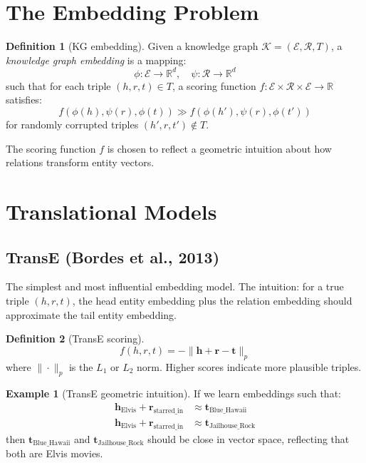 \documentclass[11pt,a4paper,oneside,openany]{book}
\theoremstyle{definition}
\newtheorem{definition}{Definition}[chapter]
\newtheorem{example}{Example}[chapter]
\theoremstyle{plain}
\theoremstyle{remark}
\newcommand{\R}{\mathbb{R}}
\newcommand{\cE}{\mathcal{E}}
\newcommand{\cR}{\mathcal{R}}
\newcommand{\kg}{\mathcal{K}}
\begin{document}
\section{The Embedding Problem}\label{sec:emb-problem}

\begin{definition}[KG embedding]
	Given a knowledge graph $\kg = (\cE, \cR, T)$, a \emph{knowledge graph embedding} is a mapping:
	$$\phi: \cE \to \R^d, \quad \psi: \cR \to \R^d$$
	such that for each triple $(h, r, t) \in T$, a scoring function $f: \cE \times \cR \times \cE \to \R$ satisfies:
	$$f(\phi(h), \psi(r), \phi(t)) \gg f(\phi(h'), \psi(r), \phi(t'))$$
	for randomly corrupted triples $(h', r, t') \notin T$.
\end{definition}

The scoring function $f$ is chosen to reflect a geometric intuition about how relations transform entity vectors.

\section{Translational Models}\label{sec:translational}

\subsection{TransE (Bordes et al., 2013)}

The simplest and most influential embedding model. The intuition: for a true triple $(h, r, t)$, the head entity embedding plus the relation embedding should approximate the tail entity embedding.

\begin{definition}[TransE scoring]
	$$f(h, r, t) = -\|\mathbf{h} + \mathbf{r} - \mathbf{t}\|_p$$
	where $\|\cdot\|_p$ is the $L_1$ or $L_2$ norm. Higher scores indicate more plausible triples.
\end{definition}

\begin{example}[TransE geometric intuition]
	If we learn embeddings such that:
	\begin{align*}
		\mathbf{h}_{\text{Elvis}} + \mathbf{r}_{\text{starred\_in}} & \approx \mathbf{t}_{\text{Blue\_Hawaii}}    \\
		\mathbf{h}_{\text{Elvis}} + \mathbf{r}_{\text{starred\_in}} & \approx \mathbf{t}_{\text{Jailhouse\_Rock}}
	\end{align*}
	then $\mathbf{t}_{\text{Blue\_Hawaii}}$ and $\mathbf{t}_{\text{Jailhouse\_Rock}}$ should be close in vector space, reflecting that both are Elvis movies.
\end{example}
\end{document}
